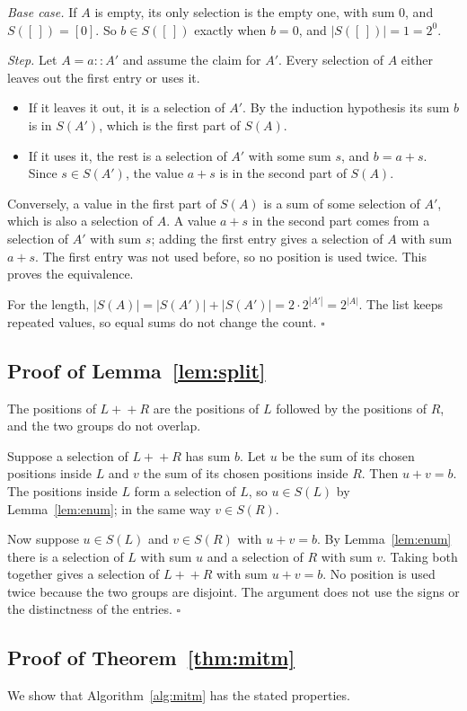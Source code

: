 \documentclass[conference]{IEEEtran}
\begin{document}
\emph{Base case.} If $A$ is empty, its only selection is the empty one, with
sum $0$, and $S([\,])=[0]$. So $b\in S([\,])$ exactly when $b=0$, and
$|S([\,])|=1=2^0$.

\emph{Step.} Let $A=a::A'$ and assume the claim for $A'$. Every selection of
$A$ either leaves out the first entry or uses it.
\begin{itemize}
\item If it leaves it out, it is a selection of $A'$. By the induction
hypothesis its sum $b$ is in $S(A')$, which is the first part of $S(A)$.
\item If it uses it, the rest is a selection of $A'$ with some sum $s$, and
$b=a+s$. Since $s\in S(A')$, the value $a+s$ is in the second part of $S(A)$.
\end{itemize}
Conversely, a value in the first part of $S(A)$ is a sum of some selection of
$A'$, which is also a selection of $A$. A value $a+s$ in the second part comes
from a selection of $A'$ with sum $s$; adding the first entry gives a selection
of $A$ with sum $a+s$. The first entry was not used before, so no position is
used twice. This proves the equivalence.

For the length, $|S(A)|=|S(A')|+|S(A')|=2\cdot2^{|A'|}=2^{|A|}$. The list keeps
repeated values, so equal sums do not change the count. \hfill$\square$

\subsection{Proof of Lemma~\ref{lem:split}}
The positions of $L+\!+R$ are the positions of $L$ followed by the positions
of $R$, and the two groups do not overlap.

Suppose a selection of $L+\!+R$ has sum $b$. Let $u$ be the sum of its chosen
positions inside $L$ and $v$ the sum of its chosen positions inside $R$. Then
$u+v=b$. The positions inside $L$ form a selection of $L$, so
$u\in S(L)$ by Lemma~\ref{lem:enum}; in the same way $v\in S(R)$.

Now suppose $u\in S(L)$ and $v\in S(R)$ with $u+v=b$. By
Lemma~\ref{lem:enum} there is a selection of $L$ with sum $u$ and a selection
of $R$ with sum $v$. Taking both together gives a selection of $L+\!+R$ with sum
$u+v=b$. No position is used twice because the two groups are disjoint. The
argument does not use the signs or the distinctness of the entries.
\hfill$\square$

\subsection{Proof of Theorem~\ref{thm:mitm}}
We show that Algorithm~\ref{alg:mitm} has the stated properties.
\end{document}
